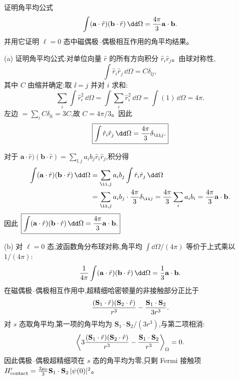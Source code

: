 \begin{question}
证明角平均公式
\[
\int (\mathbf a\cdot\hat r)(\mathbf b\cdot\hat r)\,\dd\Omega={4\pi\over3}\mathbf a\cdot\mathbf b.
\]
并用它证明 $\ell=0$ 态中磁偶极--偶极相互作用的角平均结果。
\begin{solution}
(a) 证明角平均公式:对单位向量 $\hat r$ 的所有方向积分 $\hat r_i\hat r_j$。由球对称性,
\[
\int \hat r_i\hat r_j\,\dd\Omega = C\delta_{\ii j},
\]
其中 $C$ 由缩并确定:取 $\ii=j$ 并对 $i$ 求和:
\[
\sum_i\int \hat r_i^2\,\dd\Omega = \int \sum_i \hat r_i^2\,\dd\Omega = \int (1)\,\dd\Omega = 4\pi.
\]
左边 $=\sum_i C\delta_{\ii i} = 3C$,故 $C=4\pi/3$。因此
\[
\boxed{\int \hat r_i\hat r_j\,\dd\Omega={4\pi\over3}\delta_{\ii j}.}
\]

对于 $\mathbf a\cdot\hat r)(\mathbf b\cdot\hat r) = \sum_{\ii,j}a_i b_j \hat r_i\hat r_j$,积分得
\[
\begin{aligned}
\int (\mathbf a\cdot\hat r)(\mathbf b\cdot\hat r)\,\dd\Omega
&= \sum_{\ii,j} a_i b_j \int \hat r_i\hat r_j\,\dd\Omega \\
&= \sum_{\ii,j} a_i b_j \cdot {4\pi\over3}\delta_{\ii j}
= {4\pi\over3}\sum_i a_i b_i
= {4\pi\over3}\mathbf a\cdot\mathbf b.
\end{aligned}
\]
因此 $\boxed{\int(\mathbf a\cdot\hat r)(\mathbf b\cdot\hat r)\,\dd\Omega={4\pi\over3}\mathbf a\cdot\mathbf b.}$

(b) 对 $\ell=0$ 态,波函数角分布球对称,角平均 $\int\dd\Omega/(4\pi)$ 等价于上式乘以 $1/(4\pi)$:
\[
{1\over4\pi}\int (\mathbf a\cdot\hat r)(\mathbf b\cdot\hat r)\,\dd\Omega = {1\over3}\mathbf a\cdot\mathbf b.
\]
在磁偶极--偶极相互作用中,超精细哈密顿量的非接触部分正比于
\[
{(\mathbf S_1\cdot\hat r)(\mathbf S_2\cdot\hat r)\over r^3} - {\mathbf S_1\cdot\mathbf S_2\over 3r^3}.
\]
对 $s$ 态取角平均,第一项的角平均为 $\mathbf S_1\cdot\mathbf S_2/(3r^3)$,与第二项相消:
\[
\left\langle 3{(\mathbf S_1\cdot\hat r)(\mathbf S_2\cdot\hat r)\over r^3} - {\mathbf S_1\cdot\mathbf S_2\over r^3}\right\rangle_{\Omega} = 0.
\]
因此偶极--偶极超精细项在 $s$ 态的角平均为零,只剩 Fermi 接触项 $H'_{\rm contact} = {2\mu_0\over3}\mathbf S_1\cdot\mathbf S_2\,|\psi(0)|^2$。
\end{solution}
\end{question}

